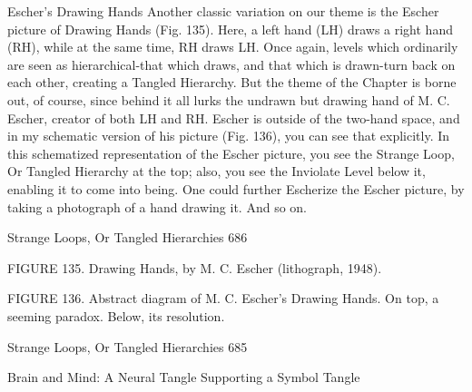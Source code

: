                              Escher's Drawing Hands
Another classic variation on our theme is the Escher picture of Drawing Hands (Fig.
135). Here, a left hand (LH) draws a right hand (RH), while at the same time, RH draws
LH. Once again, levels which ordinarily are seen as hierarchical-that which draws, and
that which is drawn-turn back on each other, creating a Tangled Hierarchy. But the theme
of the Chapter is borne out, of course, since behind it all lurks the undrawn but drawing
hand of M. C. Escher, creator of both LH and RH. Escher is outside of the two-hand
space, and in my schematic version of his picture (Fig. 136), you can see that explicitly.
In this schematized representation of the Escher picture, you see the Strange Loop, Or
Tangled Hierarchy at the top; also, you see the Inviolate Level below it, enabling it to
come into being. One could further Escherize the Escher picture, by taking a photograph
of a hand drawing it. And so on.




Strange Loops, Or Tangled Hierarchies                                                 686

          FIGURE 135. Drawing Hands, by M. C. Escher (lithograph, 1948).




 FIGURE 136. Abstract diagram of M. C. Escher's Drawing Hands. On top, a seeming
                          paradox. Below, its resolution.

Strange Loops, Or Tangled Hierarchies                                         685

                              Brain and Mind:
                 A Neural Tangle Supporting a Symbol Tangle

